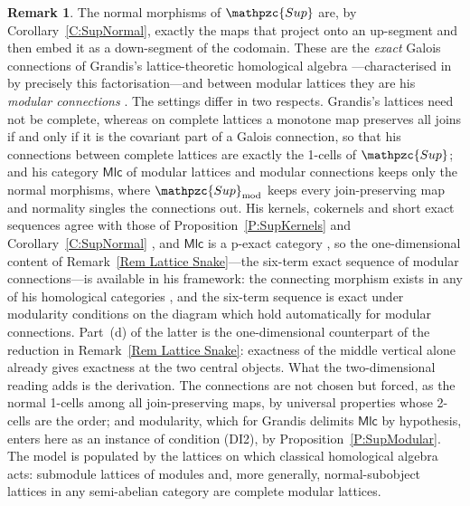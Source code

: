 \documentclass[reqno,a4paper]{amsart}
\numberwithin{equation}{section}
\theoremstyle{plain}
\theoremstyle{definition}
\newtheorem{remark}[subsection]{Remark}
\def\nameit#1{\textrm{#1}~}
\def\prox{\nameit{Proposition}}
\def\corx{\nameit{Corollary}}
\def\remx{\nameit{Remark}}
\newcommand{\catfont}[1]{\ensuremath{\mathpzc{#1}}\xspace}
\newcommand{\onecat}[1]{\ensuremath{\mathsf{#1}}\xspace}
\newcommand{\Sup}{\catfont{Sup}}
\newcommand{\Supmod}{\ensuremath{\mathpzc{Sup}_{\mathrm{mod}}}}
\renewcommand{\1}{\onecat{1}}
\newcommand{\Mlc}{\onecat{Mlc}}
\begin{document}
\begin{remark}\label{Rem Lattice Grandis}
	The normal morphisms of \(\Sup\) are, by \corx\ref{C:SupNormal}, exactly the maps that project onto an up-segment and then embed it as a down-segment of the codomain. These are the \emph{exact} Galois connections of Grandis's lattice-theoretic homological algebra \cite{Grandis-HA1,Grandis-HA2}---characterised in \cite[1.2.5]{Grandis-HA2} by precisely this factorisation---and between modular lattices they are his \emph{modular connections} \cite[1.2.8]{Grandis-HA2}. The settings differ in two respects. Grandis's lattices need not be complete, whereas on complete lattices a monotone map preserves all joins if and only if it is the covariant part of a Galois connection, so that his connections between complete lattices are exactly the 1-cells of \(\Sup\); and his category \(\Mlc\) of modular lattices and modular connections keeps only the normal morphisms, where \(\Supmod\) keeps every join-preserving map and normality singles the connections out. His kernels, cokernels and short exact sequences agree with those of \prox\ref{P:SupKernels} and \corx\ref{C:SupNormal} \cite[1.2.3]{Grandis-HA2}, and \(\Mlc\) is a p-exact category \cite[1.2.8]{Grandis-HA2}, so the one-dimensional content of \remx\ref{Rem Lattice Snake}---the six-term exact sequence of modular connections---is available in his framework: the connecting morphism exists in any of his homological categories \cite[Lemma~3.3.3]{Grandis-HA2}, and the six-term sequence is exact under modularity conditions on the diagram \cite[Proposition~3.3.4]{Grandis-HA2} which hold automatically for modular connections. Part~(d) of the latter is the one-dimensional counterpart of the reduction in \remx\ref{Rem Lattice Snake}: exactness of the middle vertical alone already gives exactness at the two central objects. What the two-dimensional reading adds is the derivation. The connections are not chosen but forced, as the normal 1-cells among all join-preserving maps, by universal properties whose 2-cells are the order; and modularity, which for Grandis delimits \(\Mlc\) by hypothesis, enters here as an instance of condition \textup{(DI2)}, by \prox\ref{P:SupModular}. The model is populated by the lattices on which classical homological algebra acts: submodule lattices of modules and, more generally, normal-subobject lattices in any semi-abelian category are complete modular lattices.
\end{remark}
\end{document}
